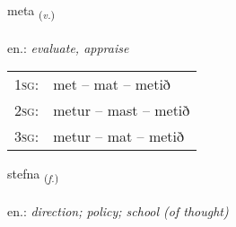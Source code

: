 \documentclass[frontgrid, backgrid]{flacards}\usepackage[]{graphicx}\usepackage[]{xcolor}
\begin{document}
\renewcommand{\flhead}{\vskip5pt \fboxsep=0pt {\small\bfseries\footnotesize Sagnorð | Verb}}
\renewcommand{\fcfoot}{\vskip5pt \fboxsep=0pt \hspace{2pt}{\small\bfseries\footnotesize 1K}}

\renewcommand{\blhead}{\vskip5pt {\small\bfseries\footnotesize Sagnorð | Verb }}
\renewcommand{\bcfoot}{\vskip5pt \hspace{2pt}{\small\bfseries\footnotesize 1K}}


{meta \small{\textsubscript{(\textit{v.})}} \\[1ex] %
\textphonetic{[mɛːta]} \\
en.: \emph{evaluate, appraise} \\  [2ex]
\renewcommand*{\arraystretch}{0.8}
\begin{tabular}{p{1cm}l}
\textsc{1sg}: & met -- mat -- metið \\ 
\textsc{2sg}: & metur -- mast -- metið \\ 
\textsc{3sg}: & metur -- mat -- metið \\ 
\end{tabular}
}

\renewcommand{\flhead}{\vskip5pt \fboxsep=0pt {\small\bfseries\footnotesize Nafnorð | Noun}}
\renewcommand{\fcfoot}{\vskip5pt \fboxsep=0pt \hspace{2pt}{\small\bfseries\footnotesize 1K}}

\renewcommand{\blhead}{\vskip5pt {\small\bfseries\footnotesize Nafnorð | Noun }}
\renewcommand{\bcfoot}{\vskip5pt \hspace{2pt}{\small\bfseries\footnotesize 1K}}


{stefna \small{\textsubscript{(\textit{f.})}} \\[1ex] %
\textphonetic{[stɛpna]} \\
en.: \emph{direction; policy; school (of thought)} \\  [2ex]
\renewcommand*{\arraystretch}{0.8}
}
\end{document}
